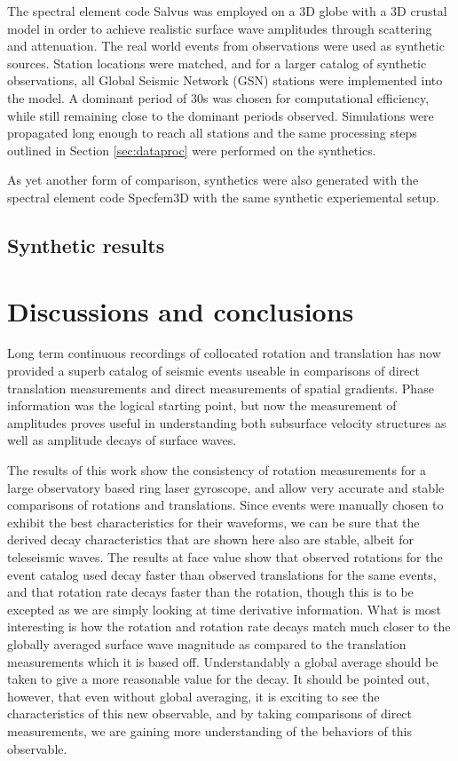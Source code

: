 \documentclass{gji}
\begin{document}
The spectral element code Salvus was employed on a 3D globe with a 3D crustal model in order to achieve realistic surface wave amplitudes through scattering and attenuation. The real world events from observations were used as synthetic sources. Station locations were matched, and for a larger catalog of synthetic observations, all Global Seismic Network (GSN) stations were implemented into the model. A dominant period of 30s was chosen for computational efficiency, while still remaining close to the dominant periods observed. Simulations were propagated long enough to reach all stations and the same processing steps outlined in Section \ref{sec:dataproc} were performed on the synthetics.

As yet another form of comparison, synthetics were also generated with the spectral element code Specfem3D with the same synthetic experiemental setup.

\subsection{Synthetic results}

\section{Discussions and conclusions}
Long term continuous recordings of collocated rotation and translation has now provided a superb catalog of seismic events useable in comparisons of direct translation measurements and direct measurements of spatial gradients. Phase information was the logical starting point, but now the measurement of amplitudes proves useful in understanding both subsurface velocity structures as well as amplitude decays of surface waves. 

The results of this work show the consistency of rotation measurements for a large observatory based ring laser gyroscope, and allow very accurate and stable comparisons of rotations and translations. Since events were manually chosen to exhibit the best characteristics for their waveforms, we can be sure that the derived decay characteristics that are shown here also are stable, albeit for teleseismic waves. The results at face value show that observed rotations for the event catalog used decay faster than observed translations for the same events, and that rotation rate decays faster than the rotation, though this is to be excepted as we are simply looking at time derivative information. What is most interesting is how the rotation and rotation rate decays match much closer to the globally averaged surface wave magnitude as compared to the translation measurements which it is based off. Understandably a global average should be taken to give a more reasonable value for the decay. It should be pointed out, however, that even without global averaging, it is exciting to see the characteristics of this new observable, and by taking comparisons of direct measurements, we are gaining more understanding of the behaviors of this observable.
\end{document}
